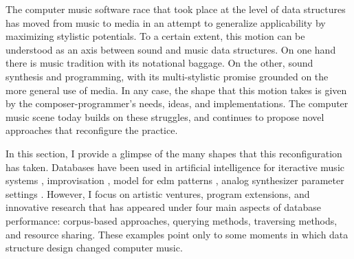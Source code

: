 The computer music software race that took place at the level of data structures has moved from music to media in an attempt to generalize applicability by maximizing stylistic potentials. To a certain extent, this motion can be understood as an axis between sound and music data structures. On one hand there is music tradition with its notational baggage. On the other, sound synthesis and programming, with its multi-stylistic promise grounded on the more general use of media. In any case, the shape that this motion takes is given by the composer-programmer's needs, ideas, and implementations. The computer music scene today builds on these struggles, and continues to propose novel approaches that reconfigure the practice.

In this section, I provide a glimpse of the many shapes that this reconfiguration has taken. Databases have been used in artificial intelligence for iteractive music systems \parencite{Row92:Int}, improvisation \parencite{DBLP:conf/icmc/AssayagDD99, DBLP:conf/icmc/BlochD08}, model for \gls{edm} patterns \parencite{rvogl:2017}, analog synthesizer parameter settings \parencite{Loviscach2008}. However, I focus on artistic ventures, program extensions, and innovative research that has appeared under four main aspects of database performance: corpus-based approaches, querying methods, traversing methods, and resource sharing. These examples point only to some moments in which data structure design changed computer music.

